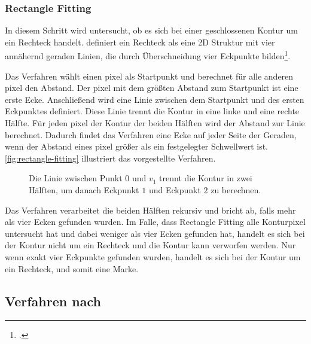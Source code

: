 
\subsubsection{Rectangle Fitting} %
\label{sub:rectangle_fitting}

In diesem Schritt wird untersucht, ob es sich bei einer geschlossenen Kontur um ein Rechteck handelt.
 \citeauthor{wagner07a} definiert ein Rechteck als eine 2D Struktur mit vier annähernd geraden Linien, die durch
 Überschneidung vier Eckpunkte bilden\footcite[Vgl.][S.~42]{wagner07a}.

Das Verfahren wählt einen \gls{pixel} als Startpunkt und berechnet für alle anderen \gls{pixel} den Abstand. Der
 \gls{pixel} mit dem größten Abstand zum Startpunkt ist eine erste Ecke. Anschließend wird eine Linie zwischen dem
 Startpunkt und des ersten Eckpunktes definiert. Diese Linie trennt die Kontur in eine linke und eine rechte Hälfte.
 Für jeden \gls{pixel} der Kontur der beiden Hälften wird der Abstand zur Linie berechnet. Dadurch findet das
 Verfahren eine Ecke auf jeder Seite der Geraden, wenn der Abstand eines \gls{pixel} größer als ein festgelegter
 Schwellwert ist. \autoref{fig:rectangle-fitting} illustriert das vorgestellte Verfahren.
\begin{figure}[!ht]
	\centering
	
	\caption{Die Linie zwischen Punkt $0$ und $v_{1}$ trennt die Kontur in zwei Hälften, um danach Eckpunkt $1$ und
	 Eckpunkt $2$ zu berechnen.}
	\label{fig:rectangle-fitting}
\end{figure}
Das Verfahren verarbeitet die beiden Hälften rekursiv und bricht ab, falls mehr als vier Ecken gefunden wurden. Im
 Falle, dass Rectangle Fitting alle Konturpixel untersucht hat und dabei weniger als vier Ecken gefunden hat, handelt
 es sich bei der Kontur nicht um ein Rechteck und die Kontur kann verworfen werden. Nur wenn exakt vier Eckpunkte
 gefunden wurden, handelt es sich bei der Kontur um ein Rechteck, und somit eine Marke.



\subsection{Verfahren nach \texorpdfstring{\citeauthor{hirzer08}}{Hirzer}} %
\label{sub:verfahren_nach_hirzer}

